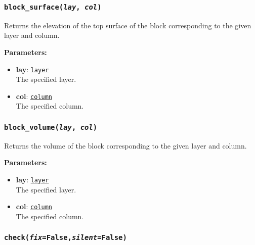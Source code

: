 \begin{snugshade}\subsubsection{\texttt{block\_surface(\emph{lay}, \emph{col})}}\end{snugshade}
\label{sec:mulgrid:block_surface}

Returns the elevation of the top surface of the block corresponding to the given layer and column.

\textbf{Parameters:}
\begin{itemize}
\item \textbf{lay}: \hyperref[layerobjects]{\texttt{layer}}\\
  The specified layer.
\item \textbf{col}: \hyperref[columnobjects]{\texttt{column}}\\
  The specified column.
\end{itemize}

\begin{snugshade}\subsubsection{\texttt{block\_volume(\emph{lay}, \emph{col})}}\end{snugshade}
\label{sec:mulgrid:block_volume}

Returns the volume of the block corresponding to the given layer and column.

\textbf{Parameters:}
\begin{itemize}
\item \textbf{lay}: \hyperref[layerobjects]{\texttt{layer}}\\
  The specified layer.
\item \textbf{col}: \hyperref[columnobjects]{\texttt{column}}\\
  The specified column.
\end{itemize}

\begin{snugshade}\subsubsection{\texttt{check(\emph{fix}=False,\emph{silent}=False)}}\end{snugshade}
\label{sec:mulgrid:check}

